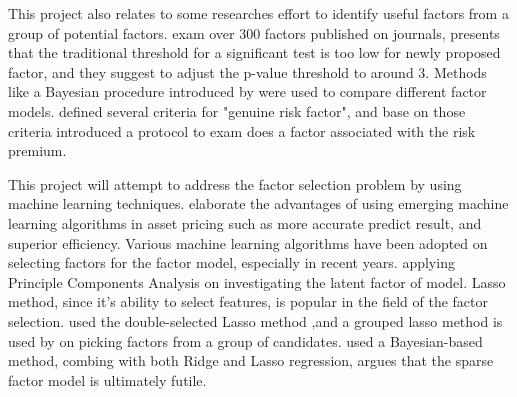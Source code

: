 	
This project also relates to some researches effort to identify useful factors from a group of potential factors.
 exam over 300 factors published on journals, presents that the traditional threshold for a significant test is too low for newly proposed factor, and they suggest to adjust the p-value threshold to around 3. 
Methods like a Bayesian procedure introduced by  were used to compare different factor models.
 defined several criteria for "genuine risk factor", and base on those criteria introduced a protocol to exam does a factor associated with the risk premium.


This project will attempt to address the factor selection problem by using machine learning techniques.
 elaborate the advantages of using emerging machine learning algorithms in asset pricing such as more accurate predict result, and superior efficiency.
Various machine learning algorithms have been adopted on selecting factors for the factor model, especially in recent years.
 applying Principle Components Analysis on investigating the latent factor of model. 
Lasso method, since it's ability to select features, is popular in the field of the factor selection.
 used the double-selected Lasso method \cite{Belloni2014},and a grouped lasso method \cite{Huang2010} is used by  on picking factors from a group of candidates. 
 used a Bayesian-based method, combing with both Ridge and Lasso regression, argues that the sparse factor model is ultimately futile. 
